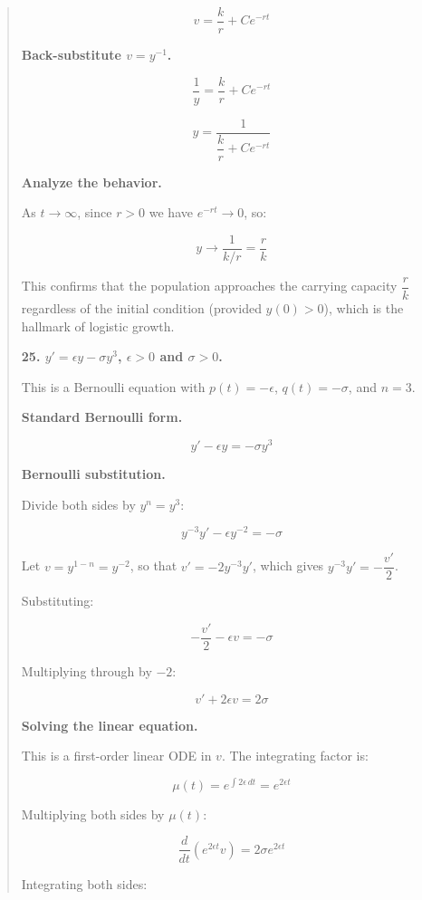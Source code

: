 \begin{quote}
\begin{respuesta}
\[
v = \frac{k}{r} + Ce^{-rt}
\]

\textbf{Back-substitute $v = y^{-1}$.}

\[
\frac{1}{y} = \frac{k}{r} + Ce^{-rt}
\]

\[
\boxed{y = \frac{1}{\dfrac{k}{r} + Ce^{-rt}}}
\]

\textbf{Analyze the behavior.}

As $t \to \infty$, since $r > 0$ we have $e^{-rt} \to 0$, so:

\[
y \to \frac{1}{k/r} = \frac{r}{k}
\]

This confirms that the population approaches the carrying capacity $\dfrac{r}{k}$ regardless of the initial condition (provided $y(0) > 0$), which is the hallmark of logistic growth.

\end{respuesta}



\textbf{25. $y' = \epsilon y - \sigma y^3$, $\epsilon > 0$ and $\sigma > 0$.}
\begin{respuesta}

This is a Bernoulli equation with $p(t) = -\epsilon$, $q(t) = -\sigma$, and $n = 3$.

\textbf{Standard Bernoulli form.}

\[
y' - \epsilon y = -\sigma y^3
\]

\textbf{Bernoulli substitution.}

Divide both sides by $y^n = y^3$:

\[
y^{-3}y' - \epsilon y^{-2} = -\sigma
\]

Let $v = y^{1-n} = y^{-2}$, so that $v' = -2y^{-3}y'$, which gives $y^{-3}y' = -\dfrac{v'}{2}$.

Substituting:

\[
-\frac{v'}{2} - \epsilon v = -\sigma
\]

Multiplying through by $-2$:

\[
v' + 2\epsilon v = 2\sigma
\]

\textbf{Solving the linear equation.}

This is a first-order linear ODE in $v$. The integrating factor is:

\[
\mu(t) = e^{\int 2\epsilon\, dt} = e^{2\epsilon t}
\]

Multiplying both sides by $\mu(t)$:

\[
\frac{d}{dt}\left(e^{2\epsilon t}v\right) = 2\sigma e^{2\epsilon t}
\]

Integrating both sides:


\end{respuesta}
\end{quote}
